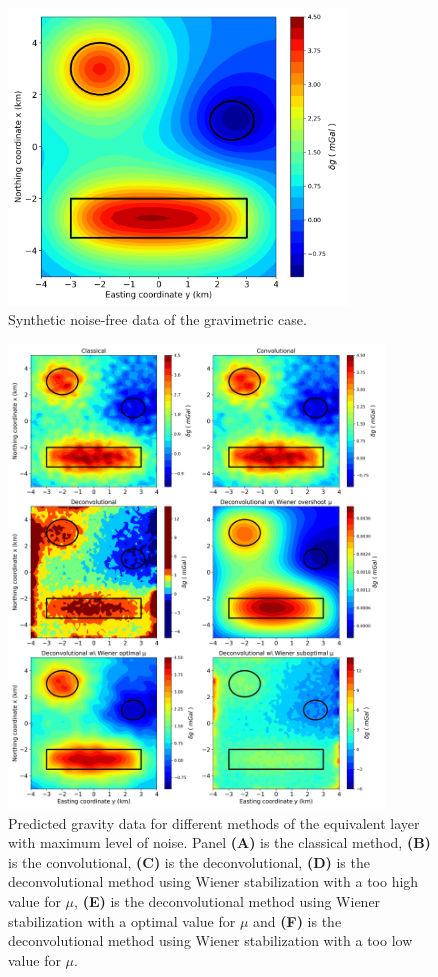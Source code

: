 \begin{figure}[htbp]
	\begin{center}
		\includegraphics[width=9cm]{Fig/synthetic_grav}
	\end{center}
	\caption{Synthetic noise-free data of the gravimetric case.}
	\label{fig:4}
\end{figure}

\begin{figure}[htbp]
	\begin{center}
		\includegraphics[width=10cm]{Fig/stability_grav_comparison}
	\end{center}
	\caption{Predicted gravity data for different methods of the equivalent layer with maximum level of noise. Panel \textbf{(A)} is the classical method, \textbf{(B)} is the convolutional, \textbf{(C)} is the deconvolutional, \textbf{(D)} is the deconvolutional method using Wiener stabilization with a too high value for $\mu$, \textbf{(E)} is the deconvolutional method using Wiener stabilization with a optimal value for $\mu$ and \textbf{(F)} is the deconvolutional method using Wiener stabilization with a too low value for $\mu$.}
	\label{fig:5}
\end{figure}

